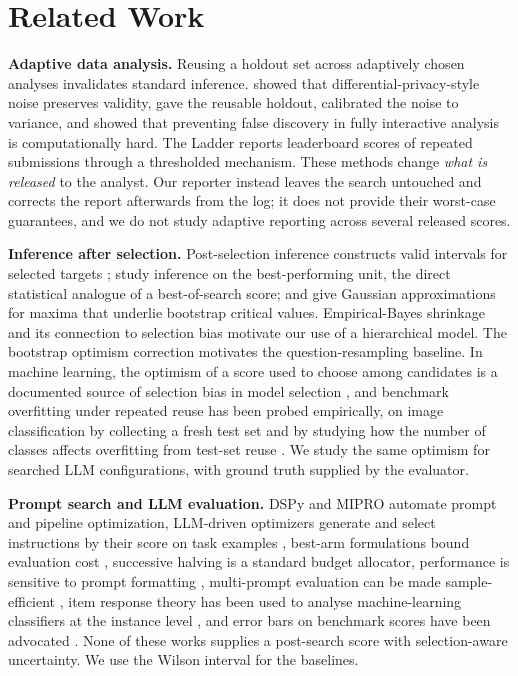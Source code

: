 \documentclass{article}
\begin{document}
\section{Related Work}
\textbf{Adaptive data analysis.} Reusing a holdout set across adaptively chosen analyses invalidates standard inference. \citet{Dwork2014PreservingSV,Dwork2015GeneralizationIA} showed that differential-privacy-style noise preserves validity, \citet{Dwork2015TheRH} gave the reusable holdout, \citet{Feldman2017CalibratingNT} calibrated the noise to variance, and \citet{Hardt2014Hard} showed that preventing false discovery in fully interactive analysis is computationally hard. The Ladder \citep{Blum2015Ladder} reports leaderboard scores of repeated submissions through a thresholded mechanism. These methods change \emph{what is released} to the analyst. Our reporter instead leaves the search untouched and corrects the report afterwards from the log; it does not provide their worst-case guarantees, and we do not study adaptive reporting across several released scores.

\textbf{Inference after selection.} Post-selection inference constructs valid intervals for selected targets \citep{Berk2013ValidPSI}; \citet{Andrews2024InferenceOnWinners} study inference on the best-performing unit, the direct statistical analogue of a best-of-search score; and \citet{Chernozhukov2013Gaussian} give Gaussian approximations for maxima that underlie bootstrap critical values. Empirical-Bayes shrinkage \citep{Efron1973Stein} and its connection to selection bias \citep{Efron2011Tweedie} motivate our use of a hierarchical model. The bootstrap optimism correction \citep{Efron1997Bootstrap632} motivates the question-resampling baseline. In machine learning, the optimism of a score used to choose among candidates is a documented source of selection bias in model selection \citep{Cawley2010Overfitting}, and benchmark overfitting under repeated reuse has been probed empirically, on image classification by collecting a fresh test set \citep{Recht2019ImageNet} and by studying how the number of classes affects overfitting from test-set reuse \citep{Feldman2019MultipleClasses}. We study the same optimism for searched LLM configurations, with ground truth supplied by the evaluator.

\textbf{Prompt search and LLM evaluation.} DSPy \citep{Khattab2023DSPy} and MIPRO \citep{OpsahlOng2024MIPRO} automate prompt and pipeline optimization, LLM-driven optimizers generate and select instructions by their score on task examples \citep{Zhou2022APE,Yang2023OPRO}, best-arm formulations bound evaluation cost \citep{Shi2024PromptBAI}, successive halving \citep{Jamieson2016SuccessiveHalving} is a standard budget allocator, performance is sensitive to prompt formatting \citep{Sclar2023Quantifying}, multi-prompt evaluation can be made sample-efficient \citep{Polo2024EfficientMultiPrompt}, item response theory has been used to analyse machine-learning classifiers at the instance level \citep{MartinezPlumed2019IRTinAI}, and error bars on benchmark scores have been advocated \citep{Miller2024ErrorBars}. None of these works supplies a post-search score with selection-aware uncertainty. We use the Wilson interval \citep{Wilson1927Probable} for the baselines.
\end{document}

